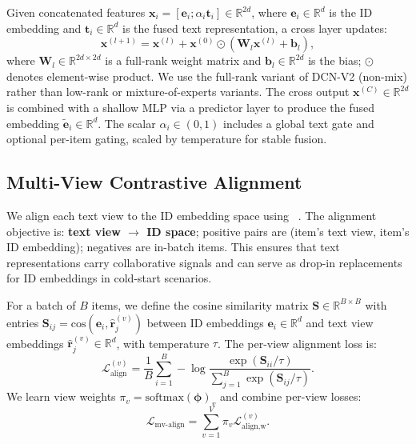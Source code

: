 Given concatenated features
$\mathbf{x}_i=[\mathbf{e}_i;\alpha_i \mathbf{t}_i] \in \mathbb{R}^{2d}$, where
$\mathbf{e}_i \in \mathbb{R}^d$ is the ID embedding and $\mathbf{t}_i \in \mathbb{R}^d$ is the
fused text representation, a cross layer updates:
\begin{equation}
  \mathbf{x}^{(l+1)} = \mathbf{x}^{(l)} + \mathbf{x}^{(0)} \odot (\mathbf{W}_l\mathbf{x}^{(l)} + \mathbf{b}_l),
\end{equation}
where $\mathbf{W}_l \in \mathbb{R}^{2d \times 2d}$ is a
full-rank weight matrix and $\mathbf{b}_l \in \mathbb{R}^{2d}$ is the bias;
$\odot$ denotes element-wise product. We use the full-rank variant of DCN-V2 (non-mix)
rather than low-rank or mixture-of-experts variants. The
cross output $\mathbf{x}^{(C)} \in \mathbb{R}^{2d}$ is combined with a shallow MLP via a predictor
layer to produce the fused embedding $\tilde{\mathbf{e}}_i \in \mathbb{R}^d$.
The scalar $\alpha_i \in (0,1)$ includes a global text gate and
optional per-item gating, scaled by temperature for stable
fusion.

\subsection{Multi-View Contrastive Alignment}
We align each text view to the ID embedding space using
\InfoNCE~\cite{oord2018cpc}. The alignment objective is:
\textbf{text view $\to$ ID space}; positive pairs are
(item's text view, item's ID embedding); negatives are
in-batch items. This ensures that text representations
carry collaborative signals and can serve as drop-in
replacements for ID embeddings in cold-start scenarios.

For a batch of $B$ items, we define
the cosine similarity matrix
$\mathbf{S} \in \mathbb{R}^{B \times B}$ with entries
$\mathbf{S}_{ij} = \mathrm{cos}(\mathbf{e}_{i},
\hat{\mathbf{r}}_{j}^{(v)})$ between ID embeddings
$\mathbf{e}_i \in \mathbb{R}^d$ and text view embeddings
$\hat{\mathbf{r}}_j^{(v)} \in \mathbb{R}^d$, with temperature $\tau$.
The per-view alignment loss is:
\begin{equation}
  \mathcal{L}_{\text{align}}^{(v)} =
  \frac{1}{B}\sum_{i=1}^{B}
  -\log \frac{\exp(\mathbf{S}_{ii}/\tau)}{\sum_{j=1}^{B}\exp(\mathbf{S}_{ij}/\tau)}.
\end{equation}
We learn view weights $\pi_v=\mathrm{softmax}(\boldsymbol{\phi})_v$
and combine per-view losses:
\begin{equation}
  \mathcal{L}_{\text{mv-align}} = \sum_{v=1}^{V}\pi_v \mathcal{L}_{\text{align,w}}^{(v)}.
\end{equation}

